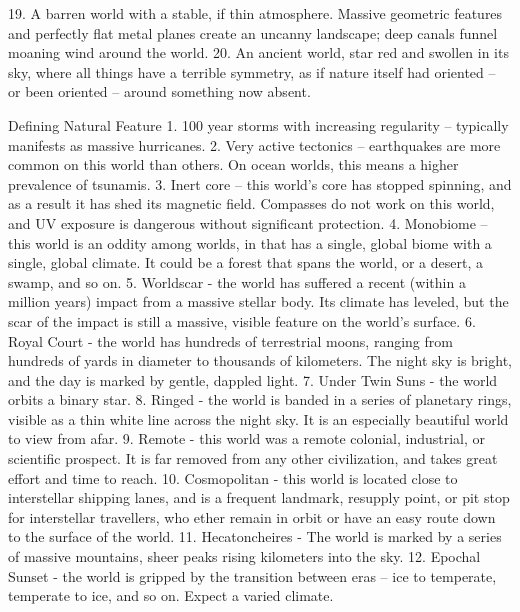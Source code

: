     19. A barren world with a stable, if thin atmosphere. Massive geometric features and perfectly
        flat metal planes create an uncanny landscape; deep canals funnel moaning wind around
        the world.
    20. An ancient world, star red and swollen in its sky, where all things have a terrible symmetry,
        as if nature itself had oriented -- or been oriented -- around something now absent.

Defining Natural Feature
    1.  100 year storms with increasing regularity -- typically manifests as massive hurricanes.
    2.  Very active tectonics -- earthquakes are more common on this world than others. On
        ocean worlds, this means a higher prevalence of tsunamis.
    3.  Inert core -- this world’s core has stopped spinning, and as a result it has shed its
        magnetic field. Compasses do not work on this world, and UV exposure is dangerous
        without significant protection.
    4.  Monobiome -- this world is an oddity among worlds, in that has a single, global biome with
        a single, global climate. It could be a forest that spans the world, or a desert, a swamp,
        and so on.
    5.  Worldscar - the world has suffered a recent (within a million years) impact from a massive
        stellar body. Its climate has leveled, but the scar of the impact is still a massive, visible
        feature on the world’s surface.
    6.  Royal Court - the world has hundreds of terrestrial moons, ranging from hundreds of yards
        in diameter to thousands of kilometers. The night sky is bright, and the day is marked by
        gentle, dappled light.
    7.  Under Twin Suns - the world orbits a binary star.
    8.  Ringed -  the world is banded in a series of planetary rings, visible as a thin white line
        across the night sky. It is an especially beautiful world to view from afar.
    9.  Remote - this world was a remote colonial, industrial, or scientific prospect. It is far
        removed from any other civilization, and takes great effort and time to reach.
    10. Cosmopolitan - this world is located close to interstellar shipping lanes, and is a frequent
        landmark, resupply point, or pit stop for interstellar travellers, who ether remain in orbit or
        have an easy route down to the surface of the world.
    11. Hecatoncheires - The world is marked by a series of massive mountains, sheer peaks
        rising kilometers into the sky.
    12. Epochal Sunset - the world is gripped by the transition between eras -- ice to temperate,
        temperate to ice, and so on. Expect a varied climate.
